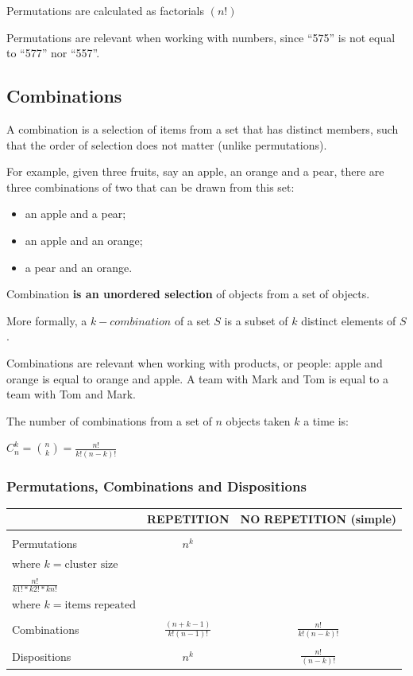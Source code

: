 \documentclass{article}
\begin{document}
Permutations are calculated as factorials $(n!)$

Permutations are relevant when working with numbers, since “575” is not equal to “577” nor “557”.

\subsection{Combinations}
A combination is a selection of items from a set that has distinct members, such that the order of selection does not matter (unlike permutations). 

For example, given three fruits, say an apple, an orange and a pear, there are three combinations of two that can be drawn from this set: 
\begin{itemize}
    \item an apple and a pear;
    \item an apple and an orange;
    \item a pear and an orange.
\end{itemize} 
Combination \textbf{is an unordered selection} of objects from a set of objects.

More formally, a $k-combination$ of a set $S$ is a subset of $k$ distinct elements of $S$.

Combinations are relevant when working with products, or people: apple and orange is equal to orange and apple. A team with Mark and Tom is equal to a team with Tom and Mark.

The number of combinations from a set of $n$ objects taken $k$ a time is:

$\displaystyle C _n ^k = \binom{n}{k} = \frac{n!}{k!(n - k)!}$

\subsubsection{Permutations, Combinations and Dispositions}
\begin{center}
\begin{tabular}{|m{2cm}|c|c|}
\hline
& REPETITION & NO REPETITION (simple) \\ \hline
&&\\[-1em]
Permutations & $\displaystyle n^k$ & \makecell{$\displaystyle \frac{n!}{(n - k)!}$ \\[15pt] where $k = \text{cluster size}$ \\[15pt] $\displaystyle \frac{n!}{k1! * k2! * kn!}$ \\[15pt] where $k = \text{items repeated}$} \\[50pt] \hline
&&\\[-1em]
Combinations & $\displaystyle \frac{(n + k - 1)}{k!(n - 1)!}$ & $\displaystyle \frac{n!}{k!(n - k)!}$ \\[25pt] \hline
&&\\[-1em]
Dispositions & $\displaystyle n^k$ & $\displaystyle \frac{n!}{(n - k)!}$ \\[25pt] 
\hline
\end{tabular}
\end{center}
\end{document}
